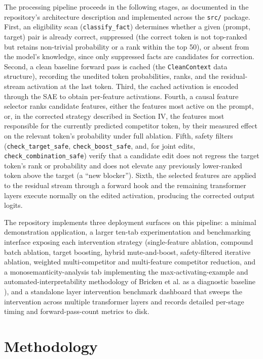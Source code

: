 \documentclass[conference]{IEEEtran}
\begin{document}
The processing pipeline proceeds in the following stages, as documented in the repository's architecture description and implemented across the \texttt{src/} package. First, an eligibility scan (\texttt{classify\_fact}) determines whether a given (prompt, target) pair is already correct, suppressed (the correct token is not top-ranked but retains non-trivial probability or a rank within the top 50), or absent from the model's knowledge, since only suppressed facts are candidates for correction. Second, a clean baseline forward pass is cached (the \texttt{CleanContext} data structure), recording the unedited token probabilities, ranks, and the residual-stream activation at the last token. Third, the cached activation is encoded through the SAE to obtain per-feature activations. Fourth, a causal feature selector ranks candidate features, either the features most active on the prompt, or, in the corrected strategy described in Section IV, the features most responsible for the currently predicted competitor token, by their measured effect on the relevant token's probability under full ablation. Fifth, safety filters (\texttt{check\_target\_safe}, \texttt{check\_boost\_safe}, and, for joint edits, \texttt{check\_combination\_safe}) verify that a candidate edit does not regress the target token's rank or probability and does not elevate any previously lower-ranked token above the target (a ``new blocker''). Sixth, the selected features are applied to the residual stream through a forward hook and the remaining transformer layers execute normally on the edited activation, producing the corrected output logits.

The repository implements three deployment surfaces on this pipeline: a minimal demonstration application, a larger ten-tab experimentation and benchmarking interface exposing each intervention strategy (single-feature ablation, compound batch ablation, target boosting, hybrid mute-and-boost, safety-filtered iterative ablation, weighted multi-competitor and multi-feature competitor reduction, and a monosemanticity-analysis tab implementing the max-activating-example and automated-interpretability methodology of Bricken et al. as a diagnostic baseline \cite{bricken2023towards}), and a standalone layer intervention benchmark dashboard that sweeps the intervention across multiple transformer layers and records detailed per-stage timing and forward-pass-count metrics to disk.

\section{Methodology}
\end{document}
